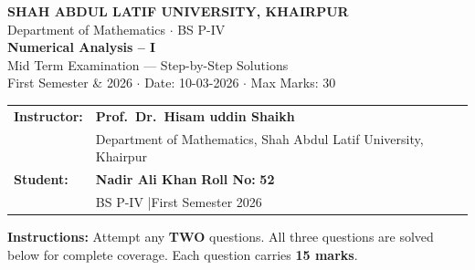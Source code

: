 \documentclass[12pt]{article}
\begin{document}
\thispagestyle{empty}

\begin{tcolorbox}[
  enhanced, arc=0pt, boxrule=0pt,
  colback=primary, colframe=primary,
  left=16pt, right=16pt, top=18pt, bottom=14pt,
  borderline south={4pt}{0pt}{gold},
]
  \centering
  {\small\color{gold}\bfseries SHAH ABDUL LATIF UNIVERSITY, KHAIRPUR}\\[2pt]
  {\small\color{lightbg} Department of Mathematics \quad $\cdot$ \quad BS P-IV}\\[8pt]
  {\huge\bfseries\color{white} Numerical Analysis -- I}\\[6pt]
  {\large\color{lightbg} Mid Term Examination --- Step-by-Step Solutions}\\[6pt]
  {\small\color{gold} First Semester \& 2026 \quad $\cdot$ \quad Date: 10-03-2026 \quad $\cdot$ \quad Max Marks: 30}
\end{tcolorbox}

\vspace{4pt}

\begin{tcolorbox}[
  enhanced, arc=0pt, boxrule=0pt,
  colback=white, colframe=white,
  borderline north={1.5pt}{0pt}{accent!60},
  borderline south={1.5pt}{0pt}{accent!60},
  left=16pt, right=16pt, top=12pt, bottom=12pt,
]
  \begin{tabular}{p{3.2cm} p{9.5cm}}
    \textcolor{primary}{\textbf{Instructor:}}
      & \textbf{Prof.\ Dr.\ Hisam uddin Shaikh} \\
      & {\small\color{darktext}Department of Mathematics, Shah Abdul Latif University, Khairpur} \\[8pt]
    \textcolor{primary}{\textbf{Student:}}
      & \textbf{Nadir Ali Khan} \quad \textcolor{primary}{\textbf{Roll No:}} \textbf{52} \\
      & {\small\color{darktext}BS P-IV \quad|\quad First Semester 2026} \\
  \end{tabular}
\end{tcolorbox}

\vspace{10pt}

\begin{observebox}
\textbf{Instructions:} Attempt any \textbf{TWO} questions. All three questions are solved below for complete coverage. Each question carries \textbf{15 marks}.
\end{observebox}
\end{document}
